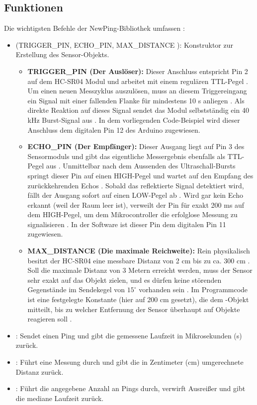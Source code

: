 \subsection{Funktionen}                                                          
Die wichtigsten Befehle der NewPing-Bibliothek umfassen \cite{Eckel:2023}:
\begin{itemize}
	\item {}(TRIGGER\_PIN, ECHO\_PIN, MAX\_DISTANCE ): Konstruktor zur Erstellung des Sensor-Objekts.
	\begin{itemize}
		\item \textbf {TRIGGER\_PIN (Der Auslöser):} 
		Dieser Anschluss entspricht Pin 2 auf dem HC-SR04 Modul und arbeitet mit einem regulären TTL-Pegel \cite{KT:2012}. Um einen neuen Messzyklus auszulösen, muss an diesem Triggereingang ein Signal mit einer fallenden Flanke für mindestens 10 \textmu s anliegen \cite{KT:2012}. Als direkte Reaktion auf dieses Signal sendet das Modul selbstständig ein 40 kHz Burst-Signal aus \cite{KT:2012}. In dem vorliegenden Code-Beispiel wird dieser Anschluss dem digitalen Pin 12 des Arduino zugewiesen.
		
		\item \textbf{ECHO\_PIN (Der Empfänger):} 
		Dieser Ausgang liegt auf Pin 3 des Sensormoduls und gibt das eigentliche Messergebnis ebenfalls als TTL-Pegel aus \cite{KT:2012}. Unmittelbar nach dem Aussenden des Ultraschall-Bursts springt dieser Pin auf einen HIGH-Pegel und wartet auf den Empfang des zurückkehrenden Echos \cite{KT:2012}. Sobald das reflektierte Signal detektiert wird, fällt der Ausgang sofort auf einen LOW-Pegel ab \cite{KT:2012}. Wird gar kein Echo erkannt (weil der Raum leer ist), verweilt der Pin für exakt 200 ms auf dem HIGH-Pegel, um dem Mikrocontroller die erfolglose Messung zu signalisieren \cite{KT:2012}. In der Software ist dieser Pin dem digitalen Pin 11 zugewiesen.
		
		\item \textbf{MAX\_DISTANCE (Die maximale Reichweite):} 
		Rein physikalisch besitzt der HC-SR04 eine messbare Distanz von 2 cm bis zu ca. 300 cm \cite{KT:2012}. Soll die maximale Distanz von 3 Metern erreicht werden, muss der Sensor sehr exakt auf das Objekt zielen, und es dürfen keine störenden Gegenstände im Sendekegel von $15^\circ$ vorhanden sein \cite{KT:2012}. Im Programmcode ist  eine festgelegte Konstante (hier auf 200 cm gesetzt), die dem -Objekt mitteilt, bis zu welcher Entfernung der Sensor überhaupt auf Objekte reagieren soll \cite{Eckel:2023}.
	\end{itemize}
	\item{}: Sendet einen Ping und gibt die gemessene Laufzeit in Mikrosekunden (\textmu s) zurück.
	\item {}: Führt eine Messung durch und gibt die in Zentimeter (cm) umgerechnete Distanz zurück.
	\item {}: Führt die angegebene Anzahl an Pings durch, verwirft Ausrei\ss er und gibt die mediane Laufzeit zurück.
\end{itemize}

